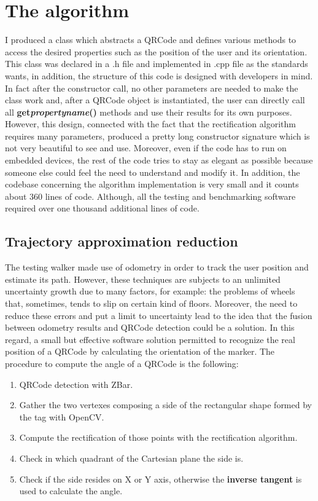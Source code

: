 \chapter{The algorithm}

I produced a class which abstracts a QRCode and defines various methods to access the desired properties such as the position of the user and its orientation. This class was declared in a .h file and implemented in .cpp file as the standards wants, in addition, the structure of this code is designed with developers in mind. In fact after the constructor call, no other parameters are needed to make the class work and, after a QRCode object is instantiated, the user can directly call all \textbf{get\textunderscore{}\emph{propertyname}()} methods and use their results for its own purposes. However, this design, connected with the fact that the rectification algorithm requires many parameters, produced a pretty long constructor signature which is not very beautiful to see and use. Moreover, even if the code has to run on embedded devices, the rest of the code tries to stay as elegant as possible because someone else could feel the need to understand and modify it.
In addition, the codebase concerning the algorithm implementation is very small and it counts about 360 lines of code. Although, all the testing and benchmarking software required over one thousand additional lines of code.

\section{Trajectory approximation reduction}
The testing walker made use of odometry in order to track the user position and estimate its path. However, these techniques are subjects to an unlimited uncertainty growth due to many factors, for example: the problems of wheels that, sometimes, tends to slip on certain kind of floors. Moreover, the need to reduce these errors and put a limit to uncertainty lead to the idea that the fusion between odometry results and QRCode detection could be a solution. In this regard, a small but effective software solution permitted to recognize the real position of a QRCode by calculating the orientation of the marker.
The procedure to compute the angle of a QRCode is the following:
\begin{enumerate}
	\item QRCode detection with ZBar.
	\item Gather the two vertexes composing a side of the rectangular shape formed by the tag with OpenCV.
	\item Compute the rectification of those points with the rectification algorithm.
	\item Check in which quadrant of the Cartesian plane the side is.
	\item Check if the side resides on X or Y axis, otherwise the \textbf{inverse tangent} is used to calculate the angle.   
\end{enumerate}

